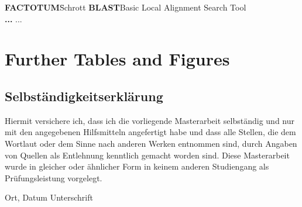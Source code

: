 \documentclass[twoside,12pt,a4paper]{report}
\begin{document}
\begin{tabbing}
\textbf{FACTOTUM}\hspace{1cm}\=Schrott\kill
\textbf{BLAST}\>Basic Local Alignment Search Tool \\
\textbf{...} \> ...\\
\end{tabbing}

\cleardoublepage


\setcounter{page}{1}


\cleardoublepage


\cleardoublepage


\cleardoublepage


\cleardoublepage


\appendix
\chapter{Further Tables and Figures} \label{chap:App}

\cleardoublepage


\printbibliography
\cleardoublepage

\thispagestyle{empty}
\section*{Selbständigkeitserklärung}

Hiermit versichere ich, dass ich die vorliegende Masterarbeit selbständig und 
nur mit den angegebenen Hilfsmitteln angefertigt habe und dass alle Stellen, 
die dem Wortlaut oder dem Sinne nach anderen Werken entnommen sind, durch 
Angaben von Quellen als Entlehnung kenntlich gemacht worden sind. 
Diese Masterarbeit wurde in gleicher oder ähnlicher Form in keinem anderen 
Studiengang als Prüfungsleistung vorgelegt. 

\vskip 3cm

Ort, Datum	\hfill Unterschrift \hfill 
\end{document}
